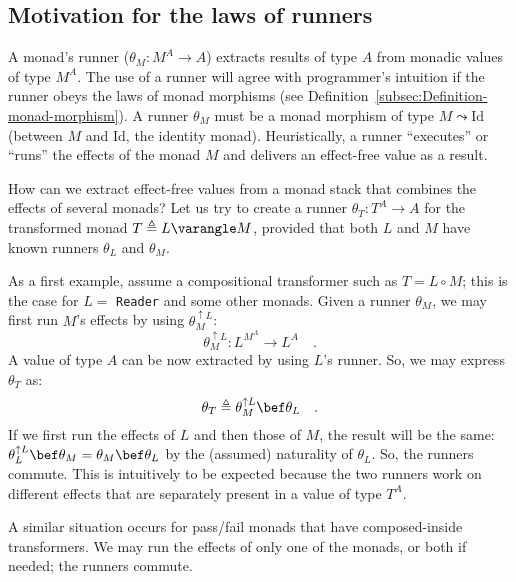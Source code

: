 \subsection{Motivation for the laws of runners}

A monad\textsf{'}s runner ($\theta_{M}:M^{A}\rightarrow A$)
extracts results of type $A$ from monadic values of type $M^{A}$.
The use of a runner will agree with programmer\textsf{'}s intuition if the
runner obeys the laws of monad morphisms (see Definition~\ref{subsec:Definition-monad-morphism}).
A runner $\theta_{M}$ must be a monad morphism of type $M\leadsto\text{Id}$
(between $M$ and $\text{Id}$, the identity monad). Heuristically,
a runner \textsf{``}executes\textsf{''} or \textsf{``}runs\textsf{''} the effects of the monad $M$
and delivers an effect-free value as a result.

How can we extract effect-free values from a monad stack that combines
the effects of several monads? Let us try to create a runner $\theta_{T}:T^{A}\rightarrow A$
for the transformed monad $T\triangleq L\varangle M$, provided that
both $L$ and $M$ have known runners $\theta_{L}$ and $\theta_{M}$.

As a first example, assume a compositional transformer such as $T=L\circ M$;
this is the case for $L=$ \lstinline!Reader! and some other monads.
Given a runner $\theta_{M}$, we may first run $M$\textsf{'}s effects by using
$\theta_{M}^{\uparrow L}$:
\[
\theta_{M}^{\uparrow L}:L^{M^{A}}\rightarrow L^{A}\quad.
\]
A value of type $A$ can be now extracted by using $L$\textsf{'}s runner.
So, we may express $\theta_{T}$ as:
\[
\theta_{T}\triangleq\theta_{M}^{\uparrow L}\bef\theta_{L}\quad.
\]
If we first run the effects of $L$ and then those of $M$, the result
will be the same: $\theta_{L}^{\uparrow L}\bef\theta_{M}=\theta_{M}\bef\theta_{L}$
by the (assumed) naturality of $\theta_{L}$. So, the runners commute.
This is intuitively to be expected because the two runners work on
different effects that are separately present in a value of type $T^{A}$.

A similar situation occurs for pass/fail monads that have composed-inside
transformers. We may run the effects of only one of the monads, or
both if needed; the runners commute.

